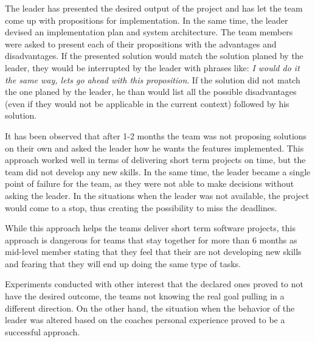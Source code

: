 The leader has presented the desired output of the project and has let the team come up with propositions for implementation. In the same time, the leader devised an implementation plan and system architecture. The team members were asked to present each of their propositions with the advantages and disadvantages. If the presented solution would match the solution planed by the leader, they would be interrupted by the leader with phrases like: \textit{I would do it the same way, lets go ahead with this proposition}. If the solution did not match the one planed by the leader, he than would list all the possible disadvantages (even if they would not be applicable in the current context) followed by his solution.

It has been observed that after 1-2 months the team was not proposing solutions on their own and asked the leader how he wants the features implemented. This approach worked well in terms of delivering short term projects on time, but the team did not develop any new skills. In the same time, the leader became a single point of failure for the team, as they were not able to make decisions without asking the leader. In the situations when the leader was not available, the project would come to a stop, thus creating the possibility to miss the deadlines.

While this approach helps the teams deliver short term software projects, this approach is dangerous for teams that stay together for more than 6 months as mid-level member stating that they feel that their are not developing new skills and fearing that they will end up doing the same type of tasks. 

Experiments conducted with other interest that the declared ones proved to not have the desired outcome, the teams not knowing the real goal pulling in a different direction. On the other hand, the situation when the behavior of the leader was altered based on the coaches personal experience proved to be a successful approach.